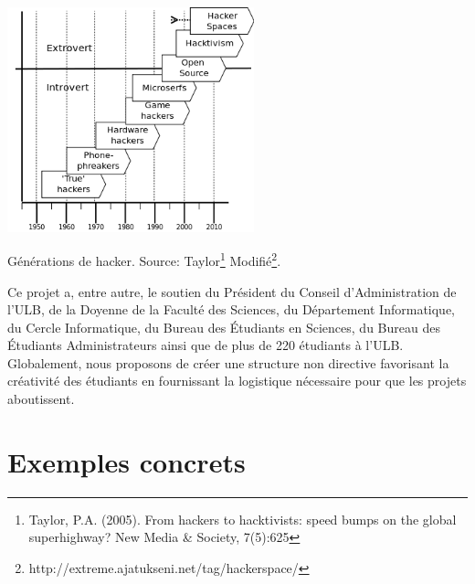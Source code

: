 \documentclass{article}
\begin{document}
\begin{center}
\includegraphics[height=65mm]{hacker-generations-divided.png}

Générations de hacker. Source: Taylor\footnote{Taylor,  P.A. (2005). From hackers to hacktivists: speed bumps on the global  superhighway? New Media \& Society, 7(5):625} Modifié\footnote{http://extreme.ajatukseni.net/tag/hackerspace/}.
\end{center}

Ce projet a, entre autre, le soutien du Président du Conseil d'Administration de l'ULB, de la Doyenne de la Faculté des Sciences, du Département Informatique, du Cercle Informatique, du Bureau des Étudiants en Sciences, du Bureau des Étudiants Administrateurs ainsi que de plus de 220 étudiants à l'ULB. Globalement, nous proposons de créer une structure non directive favorisant la créativité des étudiants en fournissant la logistique nécessaire pour que les projets aboutissent.

\section{Exemples concrets}
\end{document}
